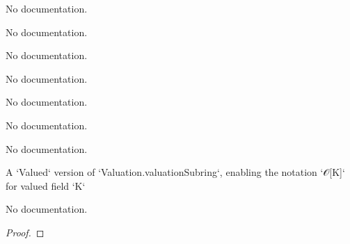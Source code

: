 \begin{theorem}\label{lowerindex_eq_iff_lowerramificationGroup}
                No documentation.
    \end{theorem}

\begin{theorem}\label{lowerramificationGroup_has_top}
                No documentation.
    \end{theorem}

\begin{theorem}\label{Valued.le_iff_val_le}
                No documentation.
    \end{theorem}

\begin{theorem}\label{Valued.lt_iff_val_lt}
                No documentation.
    \end{theorem}

\begin{theorem}\label{Valued.le_one_iff_val_le_one}
                No documentation.
    \end{theorem}

\begin{theorem}\label{Valued.lt_one_iff_val_lt_one}
                No documentation.
    \end{theorem}

\begin{theorem}\label{Valued.zero_le}
                No documentation.
    \end{theorem}

\begin{definition}\label{Valued.valuationSubring}
        \leanok
                A `Valued` version of `Valuation.valuationSubring`, enabling the notation `𝒪[K]` for valued field `K`
    \end{definition}

\begin{theorem}\label{Valued.integer_valuation_eq}
        \leanok
                No documentation.
    \end{theorem}

\begin{proof}
    \leanok
\end{proof}

